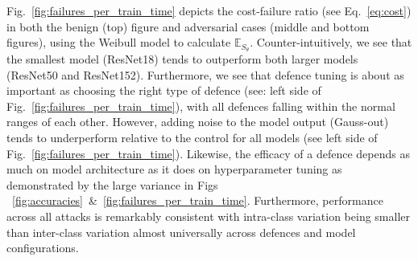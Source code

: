 Fig.~\ref{fig:failures_per_train_time} depicts the cost-failure ratio (see Eq.~\ref{eq:cost}) in both the benign (top) figure and adversarial cases (middle and bottom figures), using the Weibull model to calculate $\mathbb{E}_{S_\theta}$. Counter-intuitively, we see that the smallest model (ResNet18) tends to outperform both larger models (ResNet50 and ResNet152). Furthermore, we see that defence tuning is about as important as choosing the right type of defence (see: left side of Fig.~\ref{fig:failures_per_train_time}), with all defences falling within the normal ranges of each other. However, adding noise to the model output (Gauss-out) tends to underperform relative to the control for all models (see left side of Fig.~\ref{fig:failures_per_train_time}). Likewise, the efficacy of a defence depends as much on model architecture as it does on hyperparameter tuning as demonstrated by the large variance in Figs ~\ref{fig:accuracies}~&~\ref{fig:failures_per_train_time}.  Furthermore, performance across all attacks is remarkably consistent with intra-class variation being smaller than inter-class variation almost universally across defences and model configurations. 

